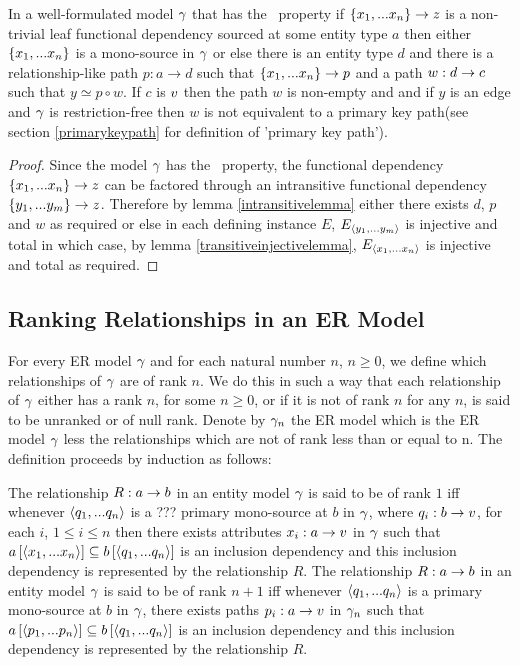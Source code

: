 \begin{lemma}
\label{mainlemma}
In a well-formulated model $\gamma$ that has the \fdfactoring\ property if $\left\{x_1,...x_n\right\} \rightarrow z$ is a non-trivial leaf functional dependency sourced
at some entity type $a$ then either $\left\{x_1,...x_n\right\}$ is a mono-source in $\gamma$
or else there is an entity type $d$ and there is a relationship-like path $p:a \rightarrow d$ such that $\{x_1,...x_n\} \rightarrow p$
and a  path $w:d \rightarrow c$  such that $y \simeq p \circ w$. If $c$ is $v$ then
the path $w$ is non-empty and and if $y$ is an edge and $\gamma$ is restriction-free then $w$ is not equivalent to a primary key path(see section \ref{primarykeypath} for definition of 'primary key path').
\end{lemma}
\begin{proof}
Since the model $\gamma$  has the \fdfactoring\ property, the functional dependency $\left\{x_1,...x_n\right\} \rightarrow z$ can be factored through an intransitive functional
dependency $\left\{y_1,...y_m\right\} \rightarrow z$. Therefore by lemma \ref{intransitivelemma} either there exists $d$, $p$ and $w$ as required
or else in each defining instance $E$, $E_{\langle y_1,...y_m\rangle}$ is injective and total in which case, by lemma \ref{transitiveinjectivelemma}, $E_{\langle x_1,...x_n\rangle}$ is injective and total as required.
\end{proof}

\subsection{Ranking Relationships in an ER Model}
For every ER model $\gamma$ and for each natural number $n$, $n \geq 0$, we define which relationships of
$\gamma$ are of rank $n$. We do this  in such a way that each relationship of $\gamma$ either has a rank $n$, for some $n \geq 0$, or if it is not of rank 
$n$ for any $n$, is said to be unranked or of null rank. Denote by $\gamma_n$ the ER model which is the ER model 
$\gamma$ less the relationships which are not of rank less than or equal to n. The definition proceeds by induction as follows:
\begin{definition}
The relationship $R: a \rightarrow b$ in an entity model $\gamma$ is said to be of rank $1$ iff whenever 
$\langle q_1,...q_n\rangle$ is a  ??? primary mono-source at $b$ in $\gamma$, where $q_i:b \rightarrow v$, for each $i$, $1 \leq i \leq n$  then there exists attributes $x_i:a \rightarrow v$ in $\gamma$ such that $a\left[\langle x_1,...x_n\rangle\right]\subseteq b\left[\langle q_1,...q_n\rangle\right]$ is an inclusion dependency and this inclusion dependency is represented by the relationship $R$. 
The relationship $R: a \rightarrow b$ in an entity model $\gamma$ is said to be of rank $n+1$ iff whenever 
$\langle q_1,...q_n\rangle$ is a primary mono-source at $b$ in $\gamma$, there exists paths $p_i:a \rightarrow v$ in $\gamma_n$ such that $a\left[\langle p_1,...p_n\rangle\right]\subseteq b\left[\langle q_1,...q_n\rangle\right]$ is an inclusion dependency and this inclusion dependency  is represented by the relationship $R$. 
\end{definition}

